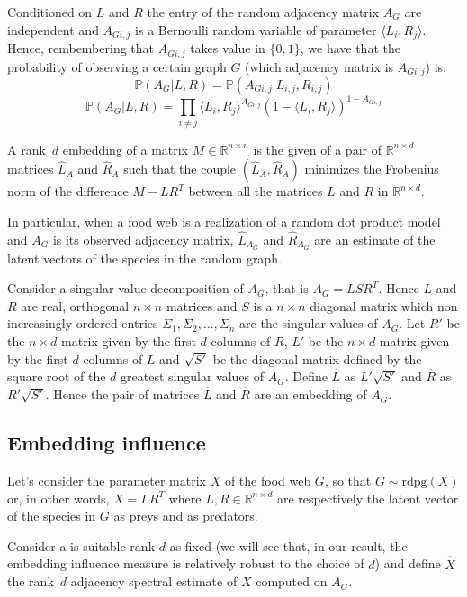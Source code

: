 \documentclass[12pt]{article}
\newcommand{\RR}{\mathbb{R}}
\theoremstyle{definition}
\begin{document}
Conditioned on $L$ and $R$ the entry of the random adjacency matrix $A_G$ are independent and $A_{Gi,j}$ is a Bernoulli random variable of parameter $\langle L_i, R_j \rangle$. Hence, rembembering that $A_{Gi,j}$ takes value in $\{ 0,1 \}$, we have that the probability of observing a certain graph $G$ (which adjacency matrix is $A_{Gi,j}$) is:
$$\mathbb{P}\left(A_G | L, R \right) = \mathbb{P}\left(A_{Gi,j} | L_{i,j}, R_{i,j} \right)$$
$$\mathbb{P}\left(A_G | L, R \right) = \prod_{i \neq j} \langle L_i, R_j \rangle^{A_{Gi,j}}(1-\langle L_i, R_j \rangle)^{1-A_{Gi,j}}$$

A rank~$d$ embedding of a matrix $M \in \RR^{n \times n}$ is the given of a pair of $\RR^{n \times d}$ matrices $\hat{L}_A$ and $\hat{R}_A$ such that the couple $(\hat{L}_A,\hat{R}_A)$ minimizes the Frobenius norm of the difference $M - LR^T$ between all the matrices $L$ and $R$ in $\RR^{n \times d}$.

In particular, when a food web is a realization of a random dot product model and $A_G$ is its observed adjacency matrix, $\hat{L}_{A_G}$ and $\hat{R}_{A_G}$ are an estimate of the latent vectors of the species in the random graph.

Consider a singular value decomposition of $A_G$, that is $A_G = LSR^T$. Hence $L$ and $R$ are real, orthogonal $n \times n$ matrices and $S$ is a $n \times n$ diagonal matrix which non increasingly ordered entries $\Sigma_1, \Sigma_2, \dots , \Sigma_n$ are the singular values of $A_G$. Let $R'$ be the $n \times d$ matrix given by the first $d$ columns of $R$, $L'$ be the $n \times d$ matrix given by the first $d$ columns of $L$ and $\sqrt{S'}$ be the diagonal matrix defined by the square root of the $d$ greatest singular values of $A_G$. Define $\hat{L}$ as $L' \sqrt{S'}$ and $\hat{R}$ as $R' \sqrt{S'}$. Hence the pair of matrices $\hat{L}$ and $\hat{R}$ are an embedding of $A_G$.

\subsection{Embedding influence}\label{subsec:es}


Let's consider the parameter matrix $X$ of the food web $G$, so that $G \sim \mbox{rdpg}(X)$ or, in other words, $X = LR^T$ where $L,R \in \RR^{n \times d}$ are respectively the latent vector of the species in $G$ as preys and as predators.

Consider a is suitable rank $d$ as fixed (we will see that, in our result, the embedding influence measure is relatively robust to the choice of $d$) and define $\hat{X}$ the rank~$d$ adjacency spectral estimate of $X$ computed on $A_G$.
\end{document}

